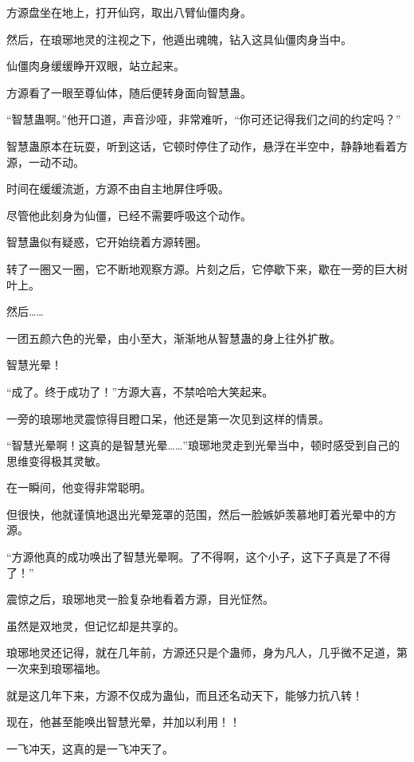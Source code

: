 
\begin{this_body}



方源盘坐在地上，打开仙窍，取出八臂仙僵肉身。

然后，在琅琊地灵的注视之下，他遁出魂魄，钻入这具仙僵肉身当中。

仙僵肉身缓缓睁开双眼，站立起来。

方源看了一眼至尊仙体，随后便转身面向智慧蛊。

“智慧蛊啊。”他开口道，声音沙哑，非常难听，“你可还记得我们之间的约定吗？”

智慧蛊原本在玩耍，听到这话，它顿时停住了动作，悬浮在半空中，静静地看着方源，一动不动。

时间在缓缓流逝，方源不由自主地屏住呼吸。

尽管他此刻身为仙僵，已经不需要呼吸这个动作。

智慧蛊似有疑惑，它开始绕着方源转圈。

转了一圈又一圈，它不断地观察方源。片刻之后，它停歇下来，歇在一旁的巨大树叶上。

然后……

一团五颜六色的光晕，由小至大，渐渐地从智慧蛊的身上往外扩散。

智慧光晕！

“成了。终于成功了！”方源大喜，不禁哈哈大笑起来。

一旁的琅琊地灵震惊得目瞪口呆，他还是第一次见到这样的情景。

“智慧光晕啊！这真的是智慧光晕……”琅琊地灵走到光晕当中，顿时感受到自己的思维变得极其灵敏。

在一瞬间，他变得非常聪明。

但很快，他就谨慎地退出光晕笼罩的范围，然后一脸嫉妒羡慕地盯着光晕中的方源。

“方源他真的成功唤出了智慧光晕啊。了不得啊，这个小子，这下子真是了不得了！”

震惊之后，琅琊地灵一脸复杂地看着方源，目光怔然。

虽然是双地灵，但记忆却是共享的。

琅琊地灵还记得，就在几年前，方源还只是个蛊师，身为凡人，几乎微不足道，第一次来到琅琊福地。

就是这几年下来，方源不仅成为蛊仙，而且还名动天下，能够力抗八转！

现在，他甚至能唤出智慧光晕，并加以利用！！

一飞冲天，这真的是一飞冲天了。


\end{this_body}

